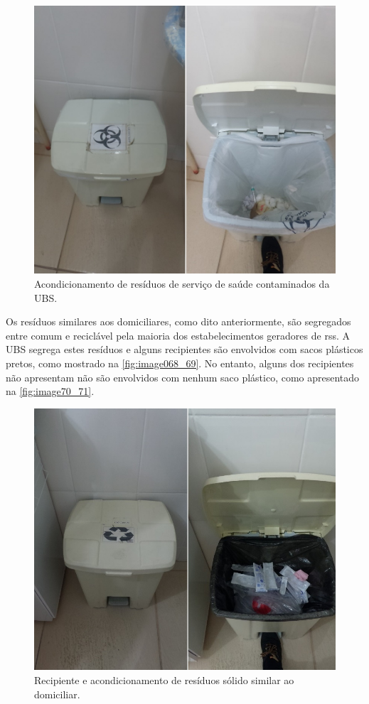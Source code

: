 \begin{figure}
	\centering
	\includegraphics[width=0.75\linewidth]{produtos/prodtres/image066_67}
	\caption{Acondicionamento de resíduos de serviço de saúde contaminados da UBS.}
	\label{fig:image066_67}
\end{figure}


Os resíduos similares aos domiciliares, como dito anteriormente, são segregados entre comum e reciclável pela maioria dos estabelecimentos geradores de \gls{rss}. A UBS segrega estes resíduos e alguns recipientes são envolvidos com sacos plásticos pretos, como mostrado na \autoref{fig:image068_69}. No entanto, alguns dos recipientes não apresentam não são envolvidos com nenhum saco plástico, como apresentado na \autoref{fig:image70_71}.

\begin{figure}
	\centering
	\includegraphics[width=0.75\linewidth]{produtos/prodtres/image068_69}
	\caption{Recipiente e acondicionamento de resíduos sólido similar ao domiciliar.}
	\label{fig:image068_69}
	
\end{figure}


